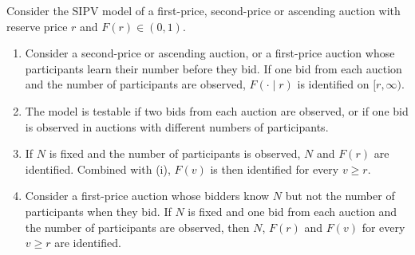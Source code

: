 \begin{proposition}\label{prop:15-reserve-ident}
Consider the SIPV model of a first-price, second-price or ascending auction with reserve price $r$ and
$F(r)\in(0,1)$.
\begin{enumerate}[label=(\roman*)]
\item Consider a second-price or ascending auction, or a first-price auction whose participants learn their number
before they bid. If one bid from each auction and the number of participants are observed, $F(\cdot\mid r)$ is
identified on $[r,\infty)$.
\item The model is testable if two bids from each auction are observed, or if one bid is observed in auctions with
different numbers of participants.
\item If $N$ is fixed and the number of participants is observed, $N$ and $F(r)$ are identified. Combined with (i),
$F(v)$ is then identified for every $v\ge r$.
\item Consider a first-price auction whose bidders know $N$ but not the number of participants when they bid. If $N$
is fixed and one bid from each auction and the number of participants are observed, then $N$, $F(r)$ and $F(v)$
for every $v\ge r$ are identified.
\end{enumerate}
\end{proposition}

